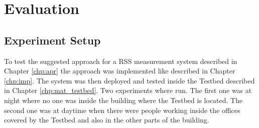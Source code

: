 \chapter{Evaluation}






\section{Experiment Setup}
To test the suggested approach for a RSS measurement system described in Chapter \ref{chp:apr} the approach was implemented like described in Chapter \ref{chp:imp}. The system was then deployed and tested inside the Testbed described in Chapter \ref{chp:mat_testbed}. Two experiments where run. The first one was at night where no one was inside the building where the Testbed is located. The second one was at daytime when there were people working inside the offices covered by the Testbed and also in the other parts of the building. 

